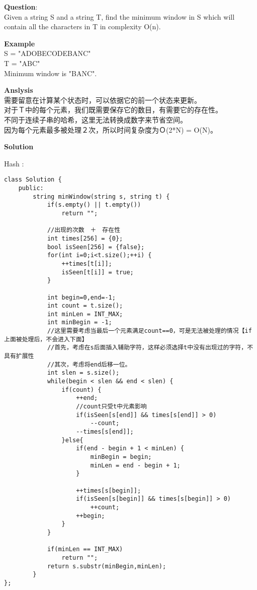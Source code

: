     
\begin{description}
    \item{\textbf{Question}}:\\%
		Given a string S and a string T, find the minimum window in S which will contain all the characters in T in complexity O(n).

    \item{\textbf{Example}}\\
		S = "ADOBECODEBANC"\\
		T = "ABC"\\
		Minimum window is "BANC".

    \item{\textbf{Anslysis}}\\
		需要留意在计算某个状态时，可以依据它的前一个状态来更新。\\
		对于Ｔ中的每个元素，我们既需要保存它的数目，有需要它的存在性。\\
		不同于连续子串的哈希，这里无法转换成数字来节省空间。\\
		因为每个元素最多被处理２次，所以时间复杂度为Ｏ(2*N) = O(N)。\\

    \item{\textbf{Solution}}\\
	\item{Hash} : \\
		\begin{lstlisting}
class Solution {
	public:
		string minWindow(string s, string t) {
			if(s.empty() || t.empty())
				return "";

			//出现的次数　＋　存在性
			int times[256] = {0};
			bool isSeen[256] = {false};
			for(int i=0;i<t.size();++i) {
				++times[t[i]];
				isSeen[t[i]] = true;
			}

			int begin=0,end=-1;
			int count = t.size();
			int minLen = INT_MAX; 
			int minBegin = -1;
			//这里需要考虑当最后一个元素满足count==0，可是无法被处理的情况【if上面被处理后，不会进入下面】
			//首先，考虑在s后面插入辅助字符，这样必须选择t中没有出现过的字符，不具有扩展性
			//其次，考虑将end后移一位。
			int slen = s.size();
			while(begin < slen && end < slen) {
				if(count) {
					++end;
					//count只受t中元素影响
					if(isSeen[s[end]] && times[s[end]] > 0)
						--count;
					--times[s[end]];
				}else{
					if(end - begin + 1 < minLen) {
						minBegin = begin;
						minLen = end - begin + 1;
					}

					++times[s[begin]];
					if(isSeen[s[begin]] && times[s[begin]] > 0)
						++count;
					++begin;
				}
			}

			if(minLen == INT_MAX)
				return "";
			return s.substr(minBegin,minLen);
		}
};

		\end{lstlisting}

\end{description}


